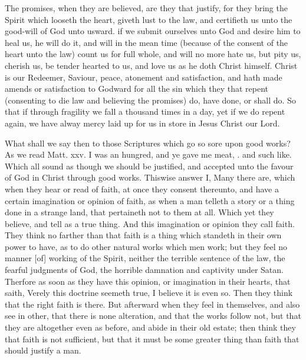 \documentclass{article}
\begin{document}
The promises, when they are believed, are they that
justify, for they bring the Spirit which looseth the heart, 
giveth lust to the law, and certifieth us unto the good-will 
of God unto usward. if we submit ourselves unto God 
and desire him to heal us, he will do it, and will in the 
mean time (because of the consent of the heart unto the 
law) count us for full whole, and will no more hate us, but 
pity us, cherish us, be tender hearted to us, and love us as 
he doth Christ himself. Christ is our Redeemer, Saviour, 
peace, atonement and satisfaction, and hath made amends 
or satisfaction to Godward for all the sin which they that 
repent (consenting to die law and believing the promises) 
do, have done, or shall do. So that if through fragility 
we fall a thousand times in a day, yet if we do repent 
again, we have alway mercy laid up for us in store in Jesus 
Christ our Lord. 


What shall we say then to those Scriptures which go so 
sore upon good works? As we read Matt. xxv. I was 
an hungred, and ye gave me meat, \ampc. and such like. 
Which all sound as though we should be justified, and
accepted unto the favour of God in Christ through good 
works. Thiswise answer I, Many there are, which when 
they hear or read of faith, at once they consent thereunto, 
and have a certain imagination or opinion of faith, as when 
a man telleth a story or a thing done in a strange land, that 
pertaineth not to them at all. Which yet they believe, and 
tell as a true thing. And this imagination or opinion they 
call faith. They think no farther than that faith is a thing 
which standeth in their own power to have, as to do other
natural works which men work; but they feel no manner 
[of] working of the Spirit, neither the terrible sentence 
of the law, the fearful judgments of God, the horrible 
damnation and captivity under Satan. Therfore as soon 
as they have this opinion, or imagination in their hearts, 
that saith, Verely this doctrine seemeth true, I believe it is 
even so. Then they think that the right faith is there. 
But afterward when they feel in themselves, and also see in 
other, that there is none alteration, and that the works 
follow not, but that they are altogether even as before, and 
abide in their old estate; then think they that faith is not 
sufficient, but that it must be some greater thing than faith 
that should justify a man. 
\end{document}
